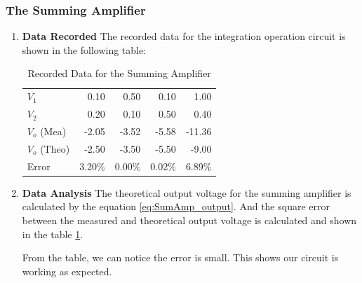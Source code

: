     \subsubsection{The Summing Amplifier}
    \begin{enumerate}[I]
        \item \textbf{Data Recorded}\newline
            The recorded data for the integration operation circuit is shown in the following table:
            \begin{table}[H]
                \centering
                \begin{tabular}{l|rrrr}
                    \toprule
                    $V_1$ & 0.10  & 0.50  & 0.10  & 1.00 \\
                    $V_2$ & 0.20  & 0.10  & 0.50  & 0.40 \\
                    \midrule
                    $V_o$ (Mea) & -2.05 & -3.52 & -5.58 & -11.36 \\
                    \midrule
                    $V_o$ (Theo) & -2.50 & -3.50 & -5.50 & -9.00 \\
                    Error & 3.20\% & 0.00\% & 0.02\% & 6.89\% \\
                    \bottomrule
                    \end{tabular}
                \caption{Recorded Data for the Summing Amplifier}
                \label{tab:SumAmp}
            \end{table}
        \item \textbf{Data Analysis}\newline
            The theoretical output voltage for the summing amplifier is calculated by the equation \ref{eq:SumAmp_output}. And the square error between the measured and theoretical output voltage is calculated and shown in the table \ref{tab:SumAmp}.\par

            From the table, we can notice the error is small. This shows our circuit is working as expected.\par
    \end{enumerate}

